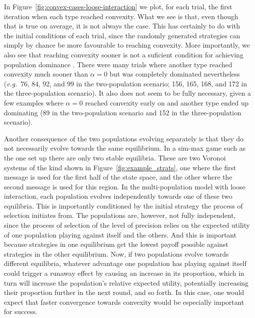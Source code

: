 \documentclass[a4paper]{article}
\begin{document}
In Figure~\ref{fig:convex-cases-loose-interaction} we plot, for each trial, the first iteration when each type reached convexity.
What we see is that, even though that is true on average, it is not always the case.
This has certainly to do with the initial conditions of each trial, since the randomly generated strategies can simply by chance be more favourable to reaching convexity.
More importantly, we also see that reaching convexity sooner is not a suficient condition for achieving population dominance .
There were many trials where another type reached convexity much sooner than $\alpha = 0$ but was completely dominated nevertheless (\emph{e.g.}~76, 84, 92, and 99 in the two-population scenario; 156, 165, 168, and 172 in the three-population scenario).
It also does not seem to be fully necessary, given a few examples where $\alpha = 0$ reached convexity early on and another type ended up dominating (89 in the two-population scenario and 152 in the three-population scenario).

Another consequence of the two populations evolving separately is that they do not necessarily evolve towards the same equilibrium.
In a sim-max game such as the one set up there are only two stable equilibria.
These are two Voronoi systems of the kind shown in Figure~\ref{fig:example_strats}, one where the first message is used for the first half of the state space, and the other where the second message is used for this region.
In the multi-population model with loose interaction, each population evolves independently towards one of these two equilibria.
This is importantly conditioned by the initial strategy the process of selection initiates from.
The populations are, however, not fully independent, since the process of selection of the level of precision relies on the expected utility of one population playing against itself and the others.
And this is important because strategies in one equilibrium get the lowest payoff possible against strategies in the other equilibrium.
Now, if two populations evolve towards different equilibria, whatever advantage one population has playing against itself could trigger a runaway effect by causing an increase in its proportion, which in turn will increase the population's relative expected utility, potentially increasing their proportion further in the next round, and so forth.
In this case, one would expect that faster convergence towards convexity would be especially important for success.
\end{document}
